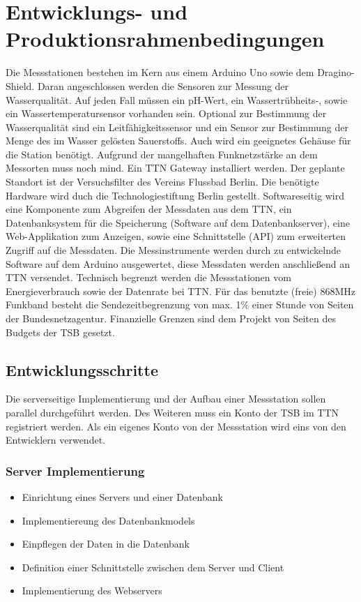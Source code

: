 \section{Entwicklungs- und Produktionsrahmenbedingungen}

Die Messstationen bestehen im Kern aus einem Arduino Uno sowie dem Dragino-Shield. Daran angeschlossen werden die Sensoren zur Messung der Wasserqualität. Auf jeden Fall müssen ein pH-Wert, ein Wassertrübheits-, sowie ein Wassertemperatursensor vorhanden sein. Optional zur Bestimmung der Wasserqualität sind ein Leitfähigkeitssensor und ein Sensor zur Bestimmung der Menge des im Wasser gelösten Sauerstoffs. Auch wird ein geeignetes Gehäuse für die Station benötigt.
Aufgrund der mangelhaften Funknetzstärke an dem Messorten muss noch mind. Ein TTN Gateway installiert werden. Der geplante Standort ist der Versuchsfilter des Vereins Flussbad Berlin. Die benötigte Hardware wird duch die Technologiestiftung Berlin gestellt.
Softwareseitig wird eine Komponente zum Abgreifen der Messdaten aus dem TTN, ein Datenbanksystem für die Speicherung (Software auf dem Datenbankserver), eine Web-Applikation zum Anzeigen, sowie eine Schnittstelle (API) zum erweiterten Zugriff auf die Messdaten. Die Messinstrumente werden durch zu entwickelnde Software auf dem Arduino ausgewertet, diese Messdaten werden anschließend an TTN versendet.
Technisch begrenzt werden die Messstationen vom Energieverbrauch sowie der Datenrate bei TTN. Für das benutzte (freie) 868MHz Funkband besteht die Sendezeitbegrenzung von max. 1\% einer Stunde von Seiten der Bundesnetzagentur.
Finanzielle Grenzen sind dem Projekt von Seiten des Budgets der TSB gesetzt.

\subsection{Entwicklungsschritte}


Die serverseitige Implementierung und der Aufbau einer Messstation sollen parallel durchgeführt werden. Des Weiteren muss ein Konto der TSB im TTN registriert werden. Als ein eigenes Konto von der Messstation wird eins von den Entwicklern verwendet.

\subsubsection{Server Implementierung}
\begin{itemize}
	\item Einrichtung eines Servers und einer Datenbank
	\item Implementiereung des Datenbankmodels
	\item Einpflegen der Daten in die Datenbank
	\item Definition einer Schnittstelle zwischen dem Server und Client
	\item Implementierung des Webservers
\end{itemize}

